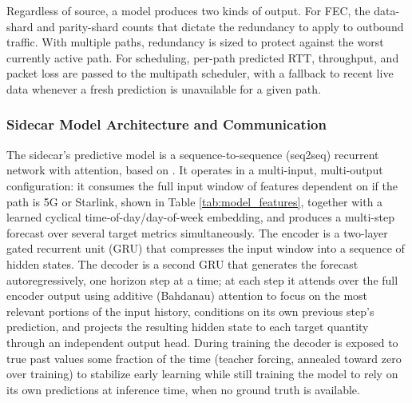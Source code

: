 \documentclass[sigconf,nonacm]{acmart}
\begin{document}
Regardless of source, a model produces two kinds of output. For FEC, the data-shard and parity-shard counts that dictate the redundancy to apply to outbound traffic. With multiple paths, redundancy is sized to protect against the worst currently active path. For scheduling, per-path predicted RTT, throughput, and packet loss are passed to the multipath scheduler, with a fallback to recent live data whenever a fresh prediction is unavailable for a given path.

\subsubsection{Sidecar Model Architecture and Communication}

The sidecar's predictive model is a sequence-to-sequence (seq2seq) recurrent network with attention, based on \cite{liu2025vivisecting}. It operates in a multi-input, multi-output configuration: it consumes the full input window of features dependent on if the path is 5G or Starlink, shown in Table \eqref{tab:model_features}, together with a learned cyclical time-of-day/day-of-week embedding, and produces a multi-step forecast over several target metrics simultaneously. The encoder is a two-layer gated recurrent unit (GRU) that compresses the input window into a sequence of hidden states. The decoder is a second GRU that generates the forecast autoregressively, one horizon step at a time; at each step it attends over the full encoder output using additive (Bahdanau) attention to focus on the most relevant portions of the input history, conditions on its own previous step's prediction, and projects the resulting hidden state to each target quantity through an independent output head. During training the decoder is exposed to true past values some fraction of the time (teacher forcing, annealed toward zero over training) to stabilize early learning while still training the model to rely on its own predictions at inference time, when no ground truth is available.
\end{document}
